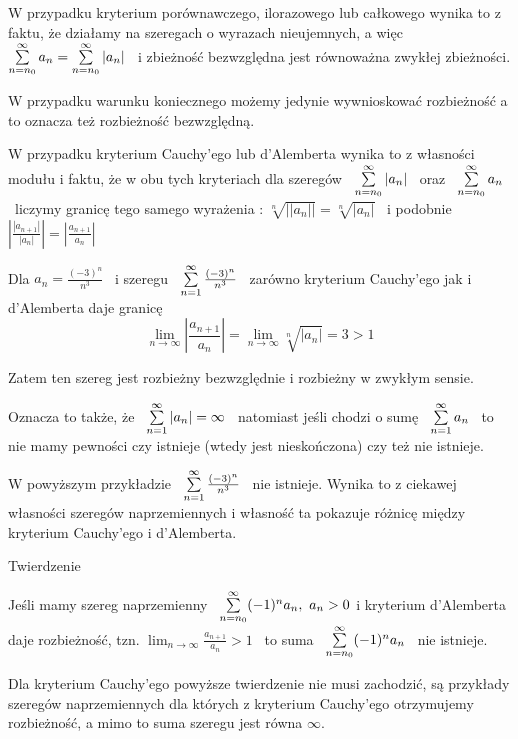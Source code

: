 W przypadku kryterium porównawczego, ilorazowego lub całkowego wynika to z faktu, że działamy na szeregach o wyrazach nieujemnych, a więc
$ \sum\limits_{n = n_0}^{\infty} a_n = \sum\limits_{n = n_0}^{\infty} |a_n| $ \ i zbieżność bezwzględna jest równoważna zwykłej zbieżności.

W przypadku warunku koniecznego możemy jedynie wywnioskować rozbieżność a to oznacza też rozbieżność bezwzględną.

W przypadku kryterium Cauchy'ego lub d'Alemberta wynika to z własności modułu i faktu, że w obu tych kryteriach dla szeregów
\ $ \sum\limits_{n = n_0}^{\infty} |a_n| $ \ oraz \ $ \sum\limits_{n = n_0}^{\infty} a_n $ \ liczymy granicę tego samego wyrażenia :
$ \sqrt[n]{||a_n||} = \sqrt[n]{|a_n|} $ \ i podobnie \ $ \left| \frac{|a_{n+1}|}{|a_n|} \right| = \left| \frac{a_{n+1}}{a_n} \right| $
\vspace{20pt}

Dla $ a_n = \frac{(-3)^n}{n^3} $ \ i szeregu \ $ \sum\limits_{n = 1}^{\infty} \frac{(-3)^n}{n^3} $ \ zarówno kryterium Cauchy'ego jak i d'Alemberta daje granicę
\[ \lim_{n \to \infty} \left| \frac{a_{n+1}}{a_n} \right| = \lim_{n \to \infty} \sqrt[n]{|a_n|} = 3 > 1 \]
\medskip

Zatem ten szereg jest rozbieżny bezwzględnie i rozbieżny w zwykłym sensie.

Oznacza to także, że \ $ \sum\limits_{n = 1}^{\infty} |a_n| = \infty $ \ natomiast jeśli chodzi o sumę \ $ \sum\limits_{n = 1}^{\infty} a_n $ \ to nie mamy pewności czy istnieje
(wtedy jest nieskończona) czy też nie istnieje.

W powyższym przykładzie \ $ \sum\limits_{n = 1}^{\infty} \frac{(-3)^n}{n^3} $ \ nie istnieje. Wynika to z ciekawej własności szeregów naprzemiennych i własność
ta pokazuje różnicę między kryterium Cauchy'ego i d'Alemberta. 
\vspace{20pt}

\begin{tw}{Twierdzenie}

Jeśli mamy szereg naprzemienny \ $ \sum\limits_{n = n_0}^{\infty} (-1)^n a_n, \ a_n > 0 $ i kryterium d'Alemberta daje rozbieżność, tzn.
$ \lim_{n \to \infty} \frac{a_{n+1}}{a_n} > 1 $ \ to suma \ $ \sum\limits_{n = n_0}^{\infty} (-1)^n a_n $ \ nie istnieje.
\end{tw}

\bigskip

Dla kryterium Cauchy'ego powyższe twierdzenie nie musi zachodzić, są przykłady szeregów naprzemiennych dla których z kryterium Cauchy'ego otrzymujemy
rozbieżność, a mimo to suma szeregu jest równa $\infty$.
\vspace{20pt}

